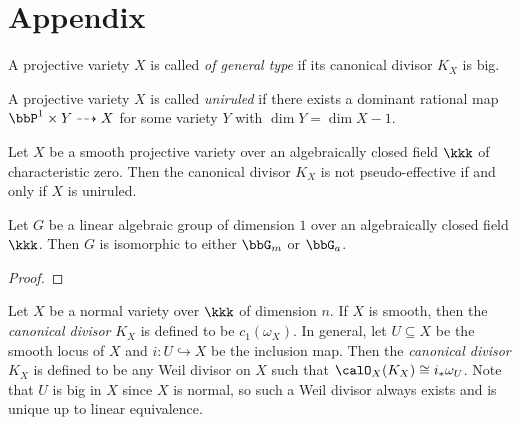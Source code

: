 \section{Appendix}

    \begin{definition}\label{def:variety_of_general_type}
        A projective variety \(X\) is called \emph{of general type} if its canonical divisor \(K_X\) is big.
    \end{definition}

    \begin{definition}\label{def:uniruled_variety}
        A projective variety \(X\) is called \emph{uniruled} if there exists a dominant rational map \(\bbP^1\times Y\dashrightarrow X\) for some variety \(Y\) with \(\dim Y=\dim X-1\).
    \end{definition}

    \begin{theorem}\label{thm:K_X_not_pseudo_effective_iff_uniruled}
        Let \(X\) be a smooth projective variety over an algebraically closed field \(\kkk\) of characteristic zero.
        Then the canonical divisor \(K_X\) is not pseudo-effective if and only if \(X\) is uniruled.
    \end{theorem}

    \begin{theorem}\label{thm:classification_of_linear_alg_gp_of_dim1}
        Let \(G\) be a linear algebraic group of dimension \(1\) over an algebraically closed field \(\kkk\). 
        Then \(G\) is isomorphic to either \(\bbG_m\) or \(\bbG_a\).
    \end{theorem}
    \begin{proof}
    \end{proof}


    \begin{definition}\label{def:canonical_divisor_on_normal_varieties}
        Let \(X\) be a normal variety over \(\kkk\) of dimension \(n\).
        If \(X\) is smooth, then the \emph{canonical divisor} \(K_X\) is defined to be \(c_1(\omega_X)\).
        In general, let \(U\subseteq X\) be the smooth locus of \(X\) and \(i:U\hookrightarrow X\) be the inclusion map.
        Then the \emph{canonical divisor} \(K_X\) is defined to be any Weil divisor on \(X\) such that \(\calO_X(K_X)\cong i_*\omega_U\).
        Note that \(U\) is big in \(X\) since \(X\) is normal, so such a Weil divisor always exists and is unique up to linear equivalence.
    \end{definition}

